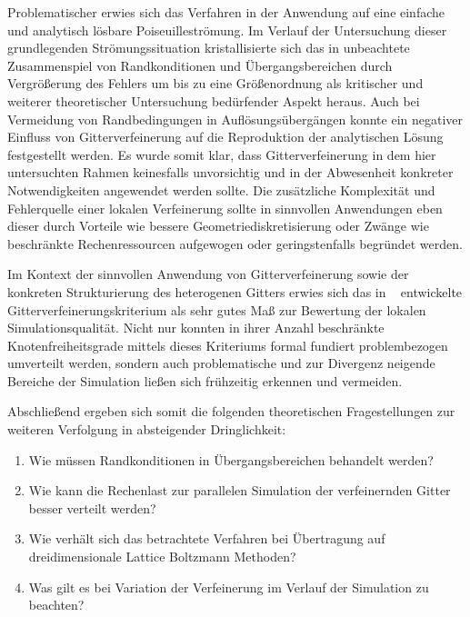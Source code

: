 Problematischer erwies sich das Verfahren in der Anwendung auf eine einfache und analytisch lösbare Poiseuilleströmung. Im Verlauf der Untersuchung dieser grundlegenden Strömungssituation kristallisierte sich das in \cite{Lagrava12} unbeachtete Zusammenspiel von Randkonditionen und Übergangsbereichen durch Vergrößerung des Fehlers um bis zu eine Größenordnung als kritischer und weiterer theoretischer Untersuchung bedürfender Aspekt heraus. Auch bei Vermeidung von Randbedingungen in Auflösungsübergängen konnte ein negativer Einfluss von Gitterverfeinerung auf die Reproduktion der analytischen Lösung festgestellt werden. Es wurde somit klar, dass Gitterverfeinerung in dem hier untersuchten Rahmen keinesfalls unvorsichtig und in der Abwesenheit konkreter Notwendigkeiten angewendet werden sollte. Die zusätzliche Komplexität und Fehlerquelle einer lokalen Verfeinerung sollte in sinnvollen Anwendungen eben dieser durch Vorteile wie bessere Geometriediskretisierung oder Zwänge wie beschränkte Rechenressourcen aufgewogen oder geringstenfalls begründet werden.

Im Kontext der sinnvollen Anwendung von Gitterverfeinerung sowie der konkreten Strukturierung des heterogenen Gitters erwies sich das in ~\cite{Lagrava15} entwickelte Gitterverfeinerungskriterium als sehr gutes Maß zur Bewertung der lokalen Simulationsqualität. Nicht nur konnten in ihrer Anzahl beschränkte Knotenfreiheitsgrade mittels dieses Kriteriums formal fundiert problembezogen umverteilt werden, sondern auch problematische und zur Divergenz neigende Bereiche der Simulation ließen sich frühzeitig erkennen und vermeiden.

\bigskip
\noindent
Abschließend ergeben sich somit die folgenden theoretischen Fragestellungen zur weiteren Verfolgung in absteigender Dringlichkeit:
\begin{enumerate}
	\item Wie müssen Randkonditionen in Übergangsbereichen behandelt werden?
	\item Wie kann die Rechenlast zur parallelen Simulation der verfeinernden Gitter besser verteilt werden?
	\item Wie verhält sich das betrachtete Verfahren bei Übertragung auf dreidimensionale Lattice Boltzmann Methoden?
	\item Was gilt es bei Variation der Verfeinerung im Verlauf der Simulation zu beachten?
\end{enumerate}

